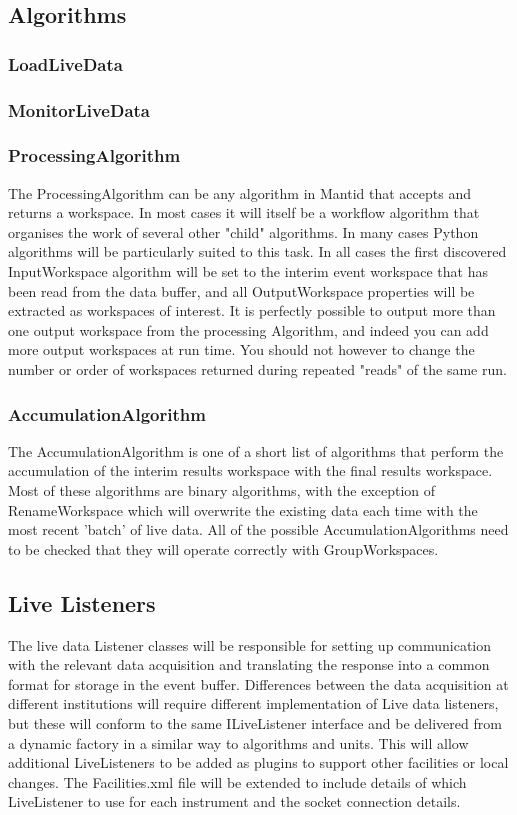 \subsection{Algorithms}

\subsubsection{LoadLiveData}

\subsubsection{MonitorLiveData}

\subsubsection{ProcessingAlgorithm}
The ProcessingAlgorithm can be any algorithm in Mantid that accepts and returns a workspace.  In most cases it will itself be a workflow algorithm that organises the work of several other "child" algorithms.  In many cases Python algorithms will be particularly suited to this task.  In all cases the first discovered InputWorkspace algorithm will be set to the interim event workspace that has been read from the data buffer, and all OutputWorkspace properties will be extracted as workspaces of interest.
It is perfectly possible to output more than one output workspace from the processing Algorithm, and indeed you can add more output workspaces at run time.  You should not however to change the number or order of workspaces returned during repeated "reads" of the same run.


\subsubsection{AccumulationAlgorithm}
The AccumulationAlgorithm is one of a short list of algorithms that perform the accumulation of the interim results workspace with the final results workspace.  Most of these algorithms are binary algorithms, with the exception of RenameWorkspace which will overwrite the existing data each time with the most recent 'batch' of live data.  All of the possible AccumulationAlgorithms need to be checked that they will operate correctly with GroupWorkspaces.

\subsection{Live Listeners}
The live data Listener classes will be responsible for setting up communication with the relevant data acquisition and translating the response into a common format for storage in the event buffer.  Differences between the data acquisition at different institutions will require different implementation of Live data listeners, but these will conform to the same ILiveListener interface and be delivered from a dynamic factory in a similar way to algorithms and units.  This will allow additional LiveListeners to be added as plugins to support other facilities or local changes.  The Facilities.xml file will be extended to include details of which LiveListener to use for each instrument and the socket connection details.

